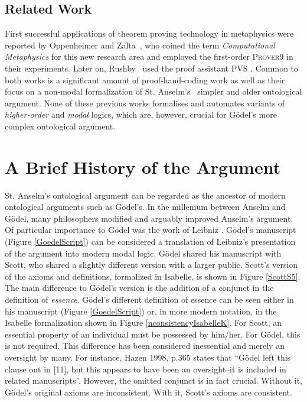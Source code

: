 \documentclass{article}
\begin{document}
\subsection{Related Work}

First successful applications of theorem proving technology in
metaphysics were reported by Oppenheimer and
Zalta~, who coined the term \textit{Computational Metaphysics} for this new research area and employed the first-order
\textsc{Prover9} \cite{Prover9} in their experiments. Later on, Rushby~ used the proof assistant \textsc{PVS} \cite{PVS}. Common to both
works is a significant amount of proof-hand-coding work as well as their
focus on a non-modal formalization of St. Anselm's~ simpler 
and older ontological argument. 
None of these previous works formalises and automates variants of \emph{higher-order} and \emph{modal} logics, which are, however, crucial
for G\"{o}del's more complex ontological argument.


\section{A Brief History of the Argument}

St. Anselm's ontological argument \cite{Proslogion} can be regarded as the ancestor of modern ontological arguments such as G\"odel's. In the millenium between Anselm and G\"odel, many philosophers modified and arguably improved Anselm's argument. Of particular importance to G\"odel was the work of Leibniz \cite{ToDo}. 
G\"odel's manuscript (Figure \ref{GoedelScript}) can be considered a translation of Leibniz's presentation of the argument into modern modal logic. G\"odel shared his manuscript with Scott, who shared a slightly different version with a larger public. Scott's version of the axioms and definitions, formalized in Isabelle, is shown in Figure \ref{ScottS5}. The main difference to G\"odel's version is the addition of a conjunct in the definition of \emph{essence}. G\"odel's different definition of essence can be seen either in his manuscript (Figure \ref{GoedelScript}) or, in more modern notation, in the Isabelle formalization shown in Figure \ref{nconsistencyIsabelleK}. For Scott, an essential property of an individual must be possessed by him/her. For G\"odel, this is not required. This difference has been considered inessential and merely an oversight by many. For instance, Hazen 1998, p.365 \cite[p.365]{Hazen1998} states that ``G\"odel left this clause out in [11], but this appears to have been an oversight--it is included in related manuscripts''. However, the omitted conjunct is in fact crucial. Without it, G\"odel's original axioms are inconsistent. With it, Scott's axioms are consistent.
\end{document}
